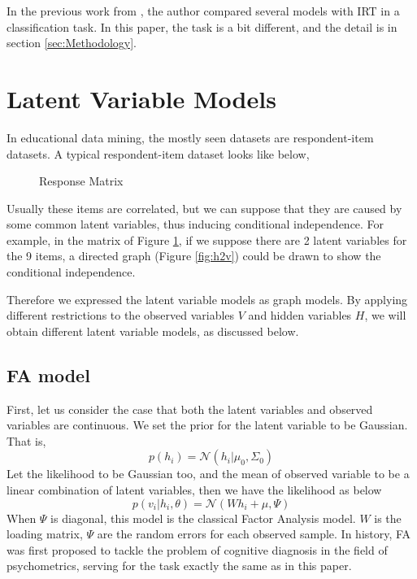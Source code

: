 \documentclass[11pt]{article}
\begin{document}
In the previous work from \cite{desmarais2011performance}, the author compared several models with IRT in a classification task. In this paper, the task is a bit different, and the detail is in section \ref{sec:Methodology}.

\section{Latent Variable Models}
In educational data mining, the mostly seen datasets are respondent-item datasets. A typical respondent-item dataset looks like below,

\begin{figure}
\centering
\caption{Response Matrix}
\label{fig:response}
\end{figure}

Usually these items are correlated, but we can suppose that they are caused by some common latent variables, thus inducing conditional independence. For example, in the matrix of Figure \ref{fig:response}, if we suppose there are 2 latent variables for the 9 items, a directed graph (Figure \ref{fig:h2v}) could be drawn to show the conditional independence.

Therefore we expressed the latent variable models as graph models. By applying different restrictions to the observed variables $V$ and hidden variables $H$, we will obtain different latent variable models, as discussed below.

\subsection{FA model}
First, let us consider the case that both the latent variables and observed variables are continuous. We set the prior for the latent variable to be Gaussian. That is, 
$$p(h_i)= \mathscr{N}(h_i|\mu_0,\Sigma_0)$$
Let the likelihood to be Gaussian too, and the mean of observed variable to be a linear combination of latent variables, then we have the likelihood as below
$$p(v_i|h_i,\theta)=\mathscr{N}(Wh_i+\mu,\Psi)$$
When $\Psi$ is diagonal, this model is the classical Factor Analysis model. $W$ is the loading matrix, $\Psi$ are the random errors for each observed sample\cite{murphy2012machine}.
In history, FA was first proposed to tackle the problem of cognitive diagnosis in the field of psychometrics, serving for the task exactly the same as in this paper.
\end{document}
